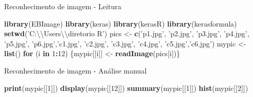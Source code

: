 \documentclass[
  ignorenonframetext,
]{beamer}
\newenvironment{Shaded}{\begin{snugshade}}{\end{snugshade}}
\newcommand{\CharTok}[1]{\textcolor[rgb]{0.31,0.60,0.02}{#1}}
\newcommand{\ControlFlowTok}[1]{\textcolor[rgb]{0.13,0.29,0.53}{\textbf{#1}}}
\newcommand{\DecValTok}[1]{\textcolor[rgb]{0.00,0.00,0.81}{#1}}
\newcommand{\KeywordTok}[1]{\textcolor[rgb]{0.13,0.29,0.53}{\textbf{#1}}}
\newcommand{\NormalTok}[1]{#1}
\newcommand{\OperatorTok}[1]{\textcolor[rgb]{0.81,0.36,0.00}{\textbf{#1}}}
\newcommand{\StringTok}[1]{\textcolor[rgb]{0.31,0.60,0.02}{#1}}
\begin{document}
\begin{frame}[fragile]{Reconhecimento de imagem - Leitura}
\protect\hypertarget{reconhecimento-de-imagem---leitura}{}

\begin{Shaded}
\begin{Highlighting}[]
\KeywordTok{library}\NormalTok{(EBImage)}
\KeywordTok{library}\NormalTok{(keras)}
\KeywordTok{library}\NormalTok{(kerasR)}
\KeywordTok{library}\NormalTok{(kerasformula)}
\KeywordTok{setwd}\NormalTok{(}\StringTok{'C:}\CharTok{\textbackslash{}\textbackslash{}}\StringTok{Users}\CharTok{\textbackslash{}\textbackslash{}}\StringTok{diretorio R'}\NormalTok{)}
\NormalTok{pics <-}\StringTok{ }\KeywordTok{c}\NormalTok{(}\StringTok{'p1.jpg'}\NormalTok{, }\StringTok{'p2.jpg'}\NormalTok{, }\StringTok{'p3.jpg'}\NormalTok{, }\StringTok{'p4.jpg'}\NormalTok{, }\StringTok{'p5.jpg'}\NormalTok{,}
          \StringTok{'p6.jpg'}\NormalTok{,}\StringTok{'c1.jpg'}\NormalTok{, }\StringTok{'c2.jpg'}\NormalTok{, }\StringTok{'c3.jpg'}\NormalTok{, }\StringTok{'c4.jpg'}\NormalTok{, }
          \StringTok{'c5.jpg'}\NormalTok{,}\StringTok{'c6.jpg'}\NormalTok{)}
\NormalTok{mypic <-}\StringTok{ }\KeywordTok{list}\NormalTok{()}
\ControlFlowTok{for}\NormalTok{ (i }\ControlFlowTok{in} \DecValTok{1}\OperatorTok{:}\DecValTok{12}\NormalTok{) \{mypic[[i]] <-}\StringTok{ }\KeywordTok{readImage}\NormalTok{(pics[i])\}}
\end{Highlighting}
\end{Shaded}

\end{frame}

\begin{frame}[fragile]{Reconhecimento de imagem - Análise manual}
\protect\hypertarget{reconhecimento-de-imagem---anuxe1lise-manual}{}

\begin{Shaded}
\begin{Highlighting}[]
\KeywordTok{print}\NormalTok{(mypic[[}\DecValTok{1}\NormalTok{]])}
\KeywordTok{display}\NormalTok{(mypic[[}\DecValTok{12}\NormalTok{]])}
\KeywordTok{summary}\NormalTok{(mypic[[}\DecValTok{1}\NormalTok{]])}
\KeywordTok{hist}\NormalTok{(mypic[[}\DecValTok{2}\NormalTok{]])}
\end{Highlighting}
\end{Shaded}

\end{frame}
\end{document}
